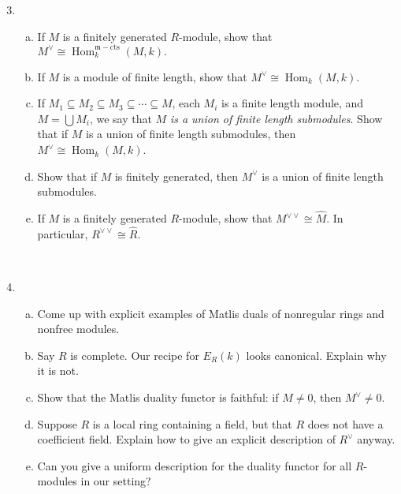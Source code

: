 \documentclass[11pt]{book}
\numberwithin{equation}{section}
\numberwithin{theorem}{chapter}
\theoremstyle{definition}
\newtheorem*{basic properties}{Basic Properties}
\newtheorem*{Important Remark}{Important Remark}
\theoremstyle{remark}
\newcommand{\m}{\mathfrak{m}}
\newcommand{\Hom}{\operatorname{Hom}}
\begin{document}
\begin{enumerate}	\setcounter{enumi}{2}
	\item \begin{enumerate}[a)]
		\item If $M$ is a finitely generated $R$-module, show that
		$M^{\vee} \cong \Hom_k^{\m-\textrm{cts}} ( M, k ).$
		
		
		
		\item If $M$ is a module of finite length, show that $M^\vee \cong \Hom_k ( M, k )$.
		
		
		
		\item If $M_1 \subseteq M_2 \subseteq M_3 \subseteq \cdots \subseteq M$, each $M_i$ is a finite length module, and $M=\bigcup M_i$, we say that $M$ \emph{is a union of finite length submodules}. Show that if $M$ is a union of finite length submodules, then $M^\vee \cong \Hom_k(M,k)$.
		
		
		
		\item Show that if $M$ is finitely generated, then $M^\vee$ is a union of finite length submodules.
		
		
		
		\item If $M$ is a finitely generated $R$-module, show that $M^{\vee \vee} \cong \widehat{M}$. In particular, $R^{\vee \vee} \cong \widehat{R}$.
		
		
		
		
	\end{enumerate}

\
	
	\item \begin{enumerate}[a)]
		\item Come up with explicit examples of Matlis duals of nonregular rings and nonfree modules.
		
		
		
		\item Say $R$ is complete. Our recipe for $E_R(k)$ looks canonical. Explain why it is not.
		
		
		
		\item Show that the Matlis duality functor is faithful: if $M\neq 0$, then $M^\vee \neq 0$.
		
		
		
		\item Suppose $R$ is a local ring containing a field, but that $R$ does not have a coefficient field. Explain how to give an explicit description of $R^\vee$ anyway.
		
		
		
		\item Can you give a uniform description for the duality functor for all $R$-modules in our setting?
		
		
	\end{enumerate}
	
	
\end{enumerate}
\end{document}
